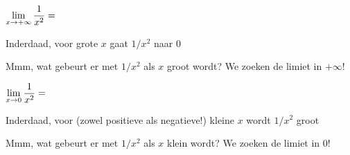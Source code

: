 \documentclass{ximera}
\begin{document}
\begin{exercise}
		\begin{question} 
			{\reversemarginpar\marginpar{\Smiley}}
			\def\isC{correct}   $\limxi    \frac{1}{x^2}= \;$   \localoefoptions 
			\begin{feedback}[correct]Inderdaad, voor grote $x$  gaat $1/x^2$ naar $0$\end{feedback}	
			\begin{feedback}[false]Mmm, wat gebeurt er met $1/x^2$ als $x$ groot wordt? We zoeken de limiet in $+\infty$!\end{feedback}
		\end{question}
		\begin{question} \def\isA{correct}   $\limx     \frac{1}{x^2}= \;$   \localoefoptions 
			\begin{feedback}[correct]Inderdaad, voor (zowel positieve als negatieve!) kleine $x$ wordt $1/x^2$ groot \end{feedback}	
			\begin{feedback}[1=0]Mmm, wat gebeurt er met $1/x^2$ als $x$ klein wordt? We zoeken de limiet in $0$!\end{feedback}
		\end{question}


\end{exercise}
\end{document}
